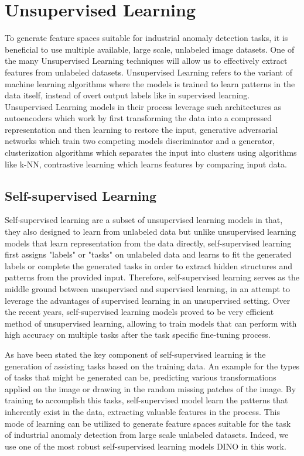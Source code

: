 \section{Unsupervised Learning}
\label{usupervised learning}
To generate feature spaces suitable for industrial anomaly detection tasks, it is beneficial to use multiple available, large scale, unlabeled image datasets. One of the many Unsupervised Learning techniques will allow us to effectively extract features from unlabeled datasets. Unsupervised Learning refers to the variant of machine learning algorithms where the models is trained to learn patterns in the data itself, instead of overt output labels like in supervised learning\cite{unsupervised_survey}. Unsupervised Learning models in their process leverage such architectures as autoencoders which work by first transforming the data into a compressed representation and then learning to restore the input, generative adversarial networks which train two competing models discriminator and a generator, clusterization algorithms which separates the input into clusters using algorithms like k-NN, contrastive learning which learns features by comparing input data\cite{unsupervised_survey}. 

\subsection{Self-supervised Learning}
\label{self-supervised learning}
Self-supervised learning are a subset of unsupervised learning models in that, they also designed to learn from unlabeled data but unlike unsupervised learning models that learn representation from the data directly, self-supervised learning first assigns "labels" or "tasks" on unlabeled data and learns to fit the generated labels or complete the generated tasks in order to extract hidden structures and patterns from the provided input\cite{self_supervised_survey}. Therefore, self-supervised learning serves as the middle ground between unsupervised and supervised learning, in an attempt to leverage the advantages of supervised learning in an unsupervised setting. Over the recent years, self-supervised learning models proved to be very efficient method of unsupervised learning, allowing to train models that can perform with high accuracy on multiple tasks after the task specific fine-tuning process\cite{self_supervised_survey}.

As have been stated the key component of self-supervised learning is the generation of assisting tasks based on the training data\cite{self_supervised_survey}\cite{dino}. An example for the types of tasks that might be generated can be, predicting various transformations applied on the image\cite{dino} or drawing in the random missing patches of the image\cite{self_patch}. By training to accomplish this tasks, self-supervised model learn the patterns that inherently exist in the data, extracting valuable features in the process. This mode of learning can be utilized to generate feature spaces suitable for the task of industrial anomaly detection from large scale unlabeled datasets. Indeed, we use one of the most robust self-supervised learning models DINO\cite{dino} in this work.

